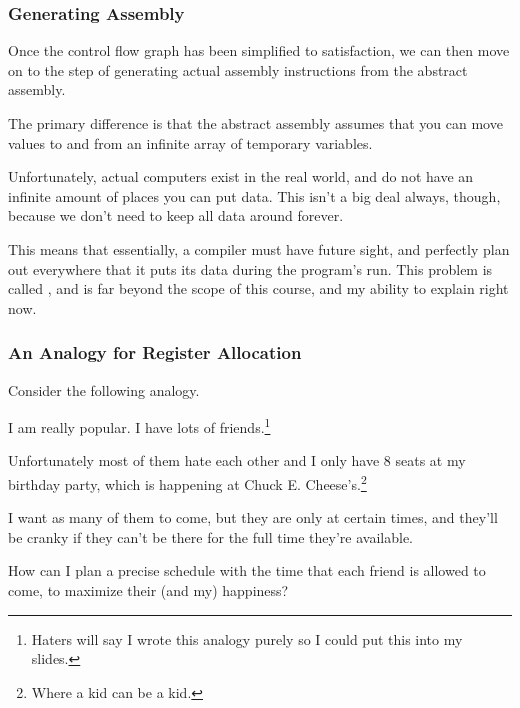 \documentclass[aspectratio=169, handout]{beamer}
\begin{document}
\begin{frame}[fragile]
  \frametitle{Generating Assembly}

  Once the control flow graph has been simplified to satisfaction, we can
  then move on to the step of generating actual assembly instructions from
  the abstract assembly.

  \pause
  \vspace{\fill}

  The primary difference is that the abstract assembly assumes that you can
  move values to and from an infinite array of temporary variables.

  \pause
  \vspace{\fill}

  Unfortunately, actual computers exist in the real world, and do not have
  an infinite amount of places you can put data. This isn't a big deal always,
  though, because we don't need to keep all data around forever.

  \pause
  \vspace{\fill}

  This means that essentially, a compiler must have future sight, and perfectly
  plan out everywhere that it puts its data during the program's run. This
  problem is called , and is far beyond the
  scope of this course, and my ability to explain right now.
\end{frame}


\begin{frame}[fragile]
  \frametitle{An Analogy for Register Allocation}

  Consider the following analogy.

  \pause
  \vspace{\fill}

  I am really popular. I have lots of friends.\footnote<2->{Haters will say I wrote
  this analogy purely so I could put this into my slides.}

  \pause
  \vspace{\fill}

  Unfortunately most of them hate each other and I only have 8 seats at
  my birthday party, which is happening at Chuck E. Cheese's.\footnote<3->{Where a kid can be a kid.}

  \pause
  \vspace{\fill}

  I want as many of them to come, but they are  only 
  at certain times, and they'll be cranky if they can't be there for the full time
  they're available.

  \pause
  \vspace{\fill}

  How can I plan a precise schedule with the time that each friend is allowed to
  come, to maximize their (and my) happiness?
\end{frame}
\end{document}
